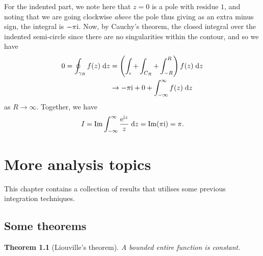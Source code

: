 \documentclass[letter-paper]{tufte-book}
\newtheorem{theorem}{\color{pastel-blue}Theorem}[section]
\newenvironment{example}[1][Example]{\begin{trivlist}
\item[\hskip \labelsep {\bfseries #1}]}{\end{trivlist}}
\newcommand{\ex}{\mathrm{e}}
\newcommand{\zi}{{\rm i}}
\begin{document}
\begin{example}
  For the indented part, we note here that $z=0$ is a pole with residue $1$, and
  noting that we are going clockwise \emph{above} the pole thus giving as an
  extra minus sign, the integral is $-\pi \zi$. Now, by Cauchy's theorem, the
  closed integral over the indented semi-circle since there are no singularities
  within the contour, and so we have
  \begin{align*}
    0 = \oint_{\gamma_R} f(z)\; \mathrm{d}z &= \left(\int_\epsilon + \int_{C_R} + \int^R_{-R}\right)f(z)\; \mathrm{d}z \\
      & \to -\pi \zi + 0 + \int^\infty_{-\infty} f(z)\; \mathrm{d}z
  \end{align*}
  as $R\to\infty$. Together, we have
  \begin{equation*}
    I = \mbox{Im} \int_{-\infty}^\infty \frac{\ex^{\zi z}}{z}\; \mathrm{d}z = \mbox{Im} (\pi \zi) = \pi.
  \end{equation*}
\end{example}


\chapter{More analysis topics}

This chapter contains a collection of results that utilises some previous
integration techniques.


\section{Some theorems}

\begin{theorem}[Liouville's theorem]
  A bounded entire function is constant.
\end{theorem}
\end{document}
